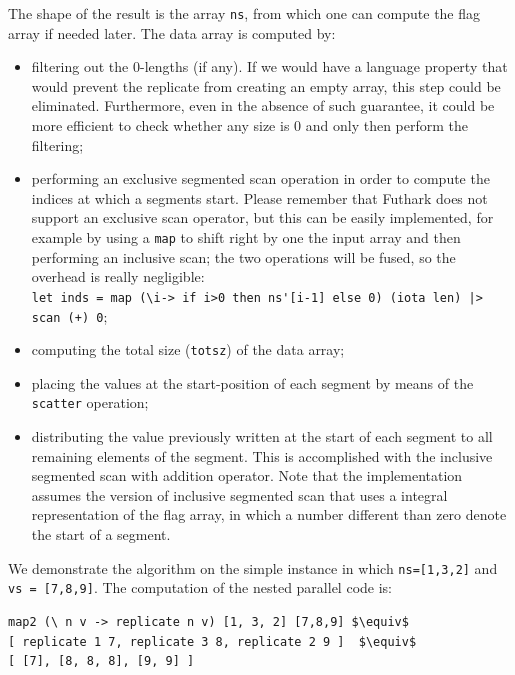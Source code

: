 \documentclass[acmsmall,review]{acmart}\settopmatter{printfolios=true,printccs=false,printacmref=false}
\begin{document}
The shape of the result is the array {\tt ns}, from which one can
compute the flag array if needed later.   The data array is computed by:
\begin{itemize}
    \item filtering out the $0$-lengths (if any). If we would 
            have a language property that would prevent the replicate
            from creating an empty array, this step could be eliminated.
            Furthermore, even in the absence of such guarantee, it
            could be more efficient to check whether any size
            is $0$ and only then perform the filtering;  
    \item performing an exclusive segmented scan operation in order
            to compute the indices at which a segments start.
          Please remember that Futhark does not support an exclusive
            scan operator, but this can be easily implemented,
            for example by using a \lstinline{map} to shift right by one
            the input array and then performing an inclusive scan;
            the two operations will be fused, so the overhead is really 
            negligible:\\
            \lstinline{let inds = map (\i-> if i>0 then ns'[i-1] else 0) (iota len) |> scan (+) 0};
    \item computing the total size ({\tt totsz}) of the data array;
    \item placing the values at the start-position of each segment
            by means of the \lstinline{scatter} operation;
    \item distributing the value previously written at the start of
            each segment to all remaining elements of the segment.
            This is accomplished with the inclusive segmented
            scan with addition operator. Note that the implementation
            assumes the version of inclusive segmented scan that uses
            a integral representation of the flag array, in which
            a number different than zero denote the start of a segment. 
\end{itemize}

We demonstrate the algorithm on the simple instance in which {\tt ns=[1,3,2]}
and {\tt vs = [7,8,9]}.
The computation of the nested parallel code is:
\begin{lstlisting}[mathescape=true]
map2 (\ n v -> replicate n v) [1, 3, 2] [7,8,9] $\equiv$
[ replicate 1 7, replicate 3 8, replicate 2 9 ]  $\equiv$
[ [7], [8, 8, 8], [9, 9] ]
\end{lstlisting}\vspace{-2ex}
\end{document}
